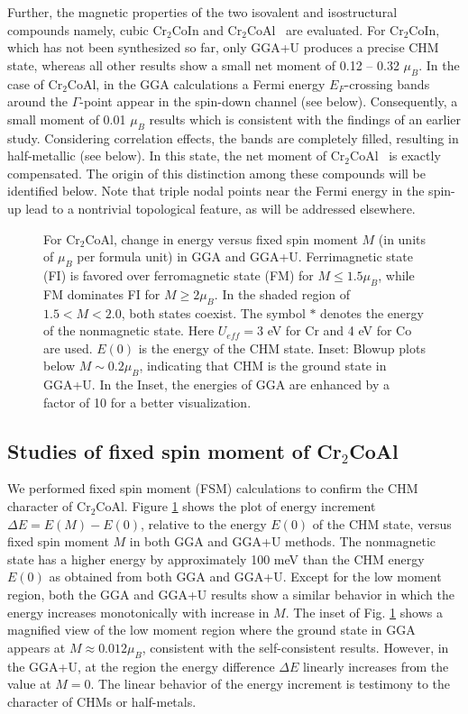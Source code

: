 \documentclass[preprint,5p]{elsarticle}
\newcommand{\cca}{Cr$_2$CoAl}
\begin{document}
Further, the magnetic properties of the two isovalent and isostructural compounds 
namely, cubic Cr$_2$CoIn and \cca~ are evaluated. 
For Cr$_2$CoIn, which has not been synthesized so far, 
only GGA+U produces a precise CHM state, 
whereas all other results show a small net moment of 0.12 -- 0.32 $\mu_B$.
In the case of \cca, in the GGA calculations 
a Fermi energy $E_F$-crossing bands around the $\Gamma$-point appear in the spin-down channel (see below). 
Consequently, a small moment of 0.01 $\mu_B$ results 
which is consistent with the findings of an earlier study.\cite{cca_the} 
Considering correlation effects, 
the bands are completely filled, resulting in half-metallic (see below).
In this state, the net moment of \cca~ is exactly compensated.
The origin of this distinction among these compounds will be identified below.
Note that triple nodal points near the Fermi energy in the spin-up lead to a nontrivial topological feature, 
as will be addressed elsewhere.\cite{nexus}


\begin{figure}[tbp]
{}
\caption{For \cca, change in energy versus fixed spin moment $M$ 
(in units of $\mu_B$ per formula unit) in GGA and GGA+U.
Ferrimagnetic state (FI) is favored over ferromagnetic state (FM) for $M \le 1.5 \mu_B$, 
while FM dominates FI for $M \ge 2 \mu_B$. 
In the shaded region of $1.5 < M < 2.0$, both states coexist.
The symbol $\ast$ denotes the energy of the nonmagnetic state.
Here $U_{eff}=3$ eV for Cr and 4 eV for Co are used.
$E(0)$ is the energy of the CHM state.
Inset: Blowup plots below $M\sim0.2 \mu_B$,
indicating that CHM is the ground state in GGA+U.
In the Inset, the energies of GGA are enhanced by a factor of 10 for a better visualization.  
}
\label{fsm}
\end{figure}

\subsection{Studies of fixed spin moment of Cr$_2$CoAl}
We performed fixed spin moment (FSM) calculations to confirm the CHM character of \cca.
Figure \ref{fsm} shows the plot of energy increment $\Delta E=E(M)-E(0)$, 
relative to the energy $E(0)$ of the CHM state, 
versus fixed spin moment $M$ in both GGA and GGA+U methods. 
The nonmagnetic state has a higher energy by approximately 100 meV 
than the CHM energy $E(0)$ as obtained from both GGA and GGA+U.   
Except for the low moment region, both the GGA and GGA+U results 
show a similar behavior in which the energy increases monotonically with increase in $M$.
The inset of Fig. \ref{fsm} shows a magnified view of the low moment region 
where the ground state in GGA appears at $M\approx0.012 \mu_B$,
consistent with the self-consistent results.
However, in the GGA+U, at the region the energy difference $\Delta E$ linearly increases 
from the value at $M=0$.
The linear behavior of the energy increment 
is testimony to the character of CHMs or half-metals.\cite{scoo}
\end{document}
